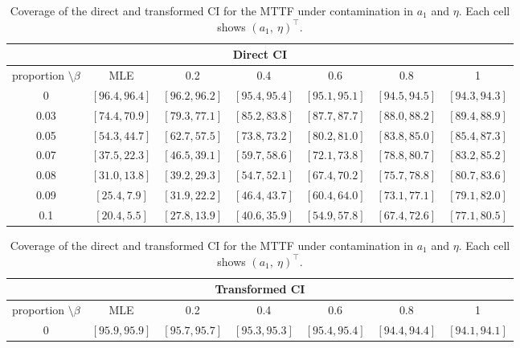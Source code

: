 \documentclass{article}
\begin{document}
\begin{table}[htbp]
\centering
\caption{Coverage of the direct and transformed CI for the MTTF under contamination in $a_1$ and $\eta$. Each cell shows $\left(a_1,\ \eta\right)^{\intercal}$.}
\label{tab:table_CI_MTTF}
\renewcommand{\arraystretch}{1.15}
\small

\begin{tabular}{c|cccccc}
\hline
\multicolumn{7}{c}{\textbf{Direct CI}} \\
\hline
proportion $\setminus \beta$ & MLE & 0.2 & 0.4 & 0.6 & 0.8 & 1 \\
\hline

0 &
$[96.4,96.4]$ &
$[96.2,96.2]$ &
$[95.4,95.4]$ &
$[95.1,95.1]$ &
$[94.5,94.5]$ &
$[94.3,94.3]$
\\

0.03 &
$[74.4,70.9]$ &
$[79.3,77.1]$ &
$[85.2,83.8]$ &
$[87.7,87.7]$ &
$[88.0,88.2]$ &
$[89.4,88.9]$
\\

0.05 &
$[54.3,44.7]$ &
$[62.7,57.5]$ &
$[73.8,73.2]$ &
$[80.2,81.0]$ &
$[83.8,85.0]$ &
$[85.4,87.3]$
\\

0.07 &
$[37.5,22.3]$ &
$[46.5,39.1]$ &
$[59.7,58.6]$ &
$[72.1,73.8]$ &
$[78.8,80.7]$ &
$[83.2,85.2]$
\\

0.08 &
$[31.0,13.8]$ &
$[39.2,29.3]$ &
$[54.7,52.1]$ &
$[67.4,70.2]$ &
$[75.7,78.8]$ &
$[80.7,83.6]$
\\

0.09 &
$[25.4,7.9]$ &
$[31.9,22.2]$ &
$[46.4,43.7]$ &
$[60.4,64.0]$ &
$[73.1,77.1]$ &
$[79.1,82.0]$
\\

0.1 &
$[20.4,5.5]$ &
$[27.8,13.9]$ &
$[40.6,35.9]$ &
$[54.9,57.8]$ &
$[67.4,72.6]$ &
$[77.1,80.5]$
\\
\end{tabular}



\vspace{0.5cm}

\begin{tabular}{c|cccccc}
\hline
\multicolumn{7}{c}{\textbf{Transformed CI}} \\
\hline
proportion $\setminus \beta$ & MLE & 0.2 & 0.4 & 0.6 & 0.8 & 1 \\
\hline

0 &
$[95.9,95.9]$ &
$[95.7,95.7]$ &
$[95.3,95.3]$ &
$[95.4,95.4]$ &
$[94.4,94.4]$ &
$[94.1,94.1]$
\\


\end{tabular}
\end{table}
\end{document}
